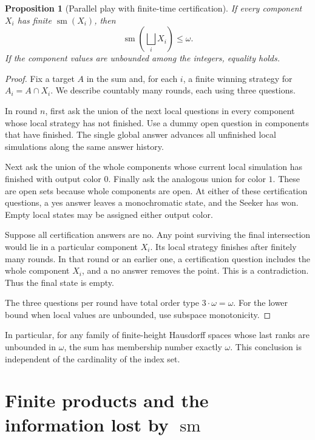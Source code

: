 \documentclass[11pt,letterpaper]{article}
\numberwithin{equation}{section}
\newtheorem{proposition}[proposition]{Proposition}
\theoremstyle{definition}
\theoremstyle{remark}
\newcommand{\sm}{\operatorname{sm}}
\newcommand{\bigsqsum}{\bigsqcup}
\begin{document}
\begin{proposition}[Parallel play with finite-time certification]\label{prop:omega-sum}
If every component $X_i$ has finite $\sm(X_i)$, then
\[
 \sm\!\left(\bigsqsum_iX_i\right)\leq\omega.
\]
If the component values are unbounded among the integers, equality holds.
\end{proposition}
\begin{proof}
Fix a target $A$ in the sum and, for each $i$, a finite winning strategy for
$A_i=A\cap X_i$. We describe countably many rounds, each using three questions.

In round $n$, first ask the union of the next local questions in every component
whose local strategy has not finished. Use a dummy open question in components
that have finished. The single global answer advances all unfinished local
simulations along the same answer history.

Next ask the union of the whole components whose current local simulation has
finished with output color $0$. Finally ask the analogous union for color $1$.
These are open sets because whole components are open. At either of these
certification questions, a yes answer leaves a monochromatic state, and the
Seeker has won. Empty local states may be assigned either output color.

Suppose all certification answers are no. Any point surviving the final
intersection would lie in a particular component $X_i$. Its local strategy
finishes after finitely many rounds. In that round or an earlier one, a
certification question includes the whole component $X_i$, and a no answer
removes the point. This is a contradiction. Thus the final state is empty.

The three questions per round have total order type $3\cdot\omega=\omega$.
For the lower bound when local values are unbounded, use subspace monotonicity.
\end{proof}

In particular, for any family of finite-height Hausdorff spaces whose last
ranks are unbounded in $\omega$, the sum has membership number exactly $\omega$.
This conclusion is independent of the cardinality of the index set.

\section{Finite products and the information lost by \texorpdfstring{$\sm$}{sm}}
\end{document}
